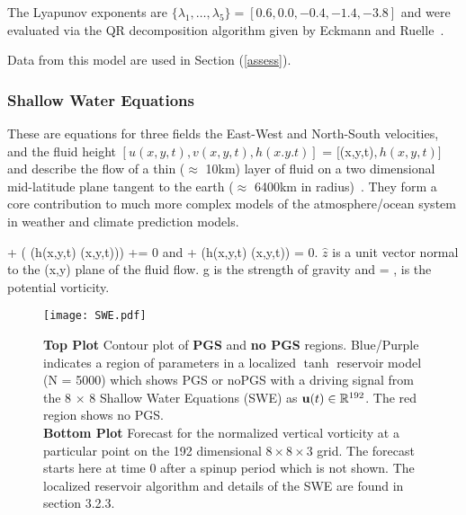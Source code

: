 \documentclass[12pt]{article}
\begin{document}
The Lyapunov exponents are $\{\lambda_1, \ldots,\lambda_5\} = [0.6,  0.0, -0.4, -1.4, -3.8]$ and were evaluated via the QR decomposition algorithm given by Eckmann and Ruelle~\cite{eckmann85}.

Data from this model are used in Section (\ref{assess}).

\subsubsection{Shallow Water Equations} 

These are equations for three fields the East-West and North-South velocities, and the fluid height $[u(x,y,t), v(x,y,t), h(x.y.t)]$ = $[$\V(x,y,t)$, h(x,y,t)]$ and describe the flow of a thin ($\approx$ 10km) layer of fluid on a two dimensional mid-latitude plane tangent to the earth ($\approx$ 6400km in radius)~\cite{sadourny75,pedlosky1986,vallis17}. They form a core contribution to much more complex models of the atmosphere/ocean system in weather and climate prediction models.

\be
{} + \eta ( \times (h(x,y,t) \V(x,y,t))) +\nabla [gh(x,y,t) + \frac{\V(x,y,t)^2}{2}] = 0 \nonumber
\ee
and
\be
{} + \nabla \cdot (h(x,y,t) \V(x,y,t)) = 0.
\ee
$\hat{z}$ is a unit vector normal to the (x,y) plane of the fluid flow. g is the strength of gravity and
\be
\eta = ,
\ee
is the potential vorticity.

\begin{figure}[!htpb]
\centering
\texttt{[image: SWE.pdf]}
\caption{{\bf Top Plot} Contour plot of {\bf PGS} and {\bf no PGS} regions. Blue/Purple indicates a region of parameters in a localized $\tanh$ reservoir model (N = 5000) which shows PGS or noPGS with a driving signal from the 8 $\times$ 8 Shallow Water Equations (SWE) \cite{sadourny75,pedlosky1986} as $\mbox{$\bf{u}$}(t) \in \mathbb{R}^{192}$. The red region shows no PGS.\\ {\bf Bottom Plot} Forecast for the normalized vertical vorticity at a particular point on the 192 dimensional $8\times8 \times 3$  grid.  The forecast starts here at time 0 after a spinup period which is not shown.  The localized reservoir algorithm and details of the SWE are found in section 3.2.3.}
\label{fig: swe}
\end{figure}
\end{document}
